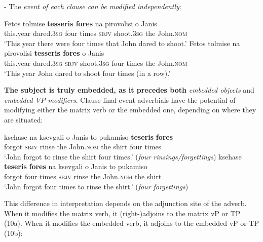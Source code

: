\documentclass[output=paper]{langsci/langscibook}
\begin{document}
{}- The \textit{event of each clause can be modified independently}:

\ea%
    \label{ex:alexiadou:8}
\ea \gll  Fetos  tolmise     \textbf{tesseris  fores} na   pirovolisi  o    Janis\\
      this.year dared.\textsc{3sg}  four    times  \textsc{sbjv} shoot.\textsc{3sg}   the  John.\textsc{nom}\\
\glt  ‘This year there were four times that John dared to shoot.’ 
\ex
\gll Fetos  tolmise  na    pirovolisi  \textbf{tesseris  fores} o    Janis\\
     this.year  dared.\textsc{3sg}  \textsc{sbjv} shoot.\textsc{3sg}   four  times  the  John.\textsc{nom}\\
\glt ‘This year John dared to shoot four times (in a row).’
\z
\z

\textbf{The subject is truly embedded, as it precedes both} \textit{embedded objects} and \textit{embedded VP-modifiers}. Clause-final event adverbials have the potential of modifying either the matrix verb or the embedded one, depending on where they are situated:



\ea%
    \label{ex:alexiadou:9}
\ea \gll  ksehase  na    ksevgali  o    Janis       to    pukamiso  \textbf{teseris}  \textbf{fores}\\
      forgot   \textsc{sbjv} rinse   the  John.\textsc{nom} the  shirt        four     times\\
  \glt    ‘John forgot to rinse the shirt four times.’ (\textit{four rinsings/forgettings})
\ex  \gll  ksehase  \textbf{teseris}  \textbf{fores} na  ksevgali  o    Janis      to  pukamiso\\
      forgot  four   times  \textsc{sbjv}  rinse  the  John.\textsc{nom} the  shirt\\
   \glt   ‘John forgot four times to rinse the shirt.’ (\textit{four forgettings})
   \z   
\z

This difference in interpretation depends on the adjunction site of the adverb. When it modifies the matrix verb, it (right-)adjoins to the matrix vP or TP (10a). When it modifies the embedded verb, it adjoins to the embedded vP or TP (10b):
\end{document}
